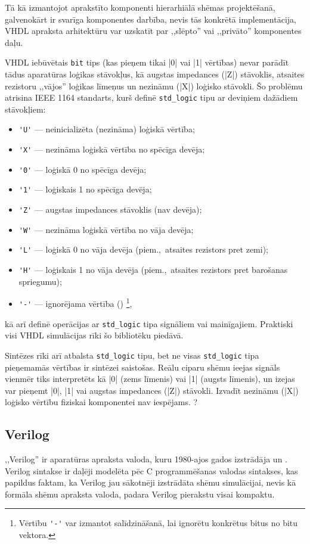 	Tā kā izmantojot aprakstīto komponenti hierarhiālā shēmas projektēšanā, 
	galvenokārt ir svarīga komponentes darbība, nevis tās konkrētā implementācija,
	VHDL apraksta arhitektūru var uzskatīt par ,,slēpto'' vai ,,privāto''
	komponentes daļu.

	VHDL iebūvētais \texttt{bit} tips (kas pieņem tikai |0| vai |1| vērtības)
	nevar parādīt tādus aparatūras loģikas stāvokļus, kā augstas impedances
	(|Z|) stāvoklis, atsaites rezistoru ,,vājos'' loģikas līmeņus un nezināmu
	(|X|) loģisko stāvokli. Šo problēmu atrisina IEEE 1164 standarts, kurš definē
	\texttt{std\_logic} tipu ar deviņiem dažādiem stāvokļiem:
	\begin{itemize}
		\item \verb|'U'| --- neinicializēta (nezināma) loģiskā vērtība;
		\item \verb|'X'| --- nezināma loģiskā vērtība no spēcīga devēja;
		\item \verb|'0'| --- loģiskā 0 no spēcīga devēja;
		\item \verb|'1'| --- loģiskais 1 no spēcīga devēja;
		\item \verb|'Z'| --- augstas impedances stāvoklis (nav devēja);
		\item \verb|'W'| --- nezināma loģiskā vērtība no vāja devēja;
		\item \verb|'L'| --- loģiskā 0 no vāja devēja (piem.,~atsaites rezistors pret zemi);
		\item \verb|'H'| --- loģiskais 1 no vāja devēja (piem.,~atsaites rezistors pret barošanas spriegumu);
		\item \verb|'-'| --- ignorējama vērtība ()%
			\footnote{Vērtību \verb|'-'| var izmantot salīdzināšanā,
				lai ignorētu konkrētus bitus no bitu vektora.},
	\end{itemize}
	kā arī definē operācijas ar \texttt{std\_logic} tipa signāliem vai mainīgajiem. 
	Praktiski visi VHDL simulācijas rīki šo bibliotēku piedāvā.
	
	Sintēzes rīki arī atbalsta \texttt{std\_logic} tipu, bet ne visas
	\texttt{std\_logic} tipa pieņemamās vērtības ir sintēzei saistošas.
	Reālu ciparu shēmu ieejas signāls vienmēr tiks interpretēts kā |0| (zems līmenis) 
	vai |1| (augsts līmenis), un izejas var pieņemt |0|, |1| vai augstas
	impedances (|Z|) stāvokli. Izvadīt nezināmu (|X|) loģisko vērtību
	fiziskai komponentei nav iespējams.	\todo{}?

\pagebreak[3]
\subsection{Verilog} \label{sec:verilog}
	,,Verilog'' ir aparatūras apraksta valoda, kuru 1980-ajos gados izstrādāja
	 un . Verilog sintakse ir daļēji modelēta
	pēc C programmēšanas valodas sintakses, kas papildus faktam, ka Verilog
	jau sākotnēji izstrādāta shēmu simulācijai, nevis
	kā formāla shēmu apraksta valoda, padara Verilog pierakstu visai kompaktu.

